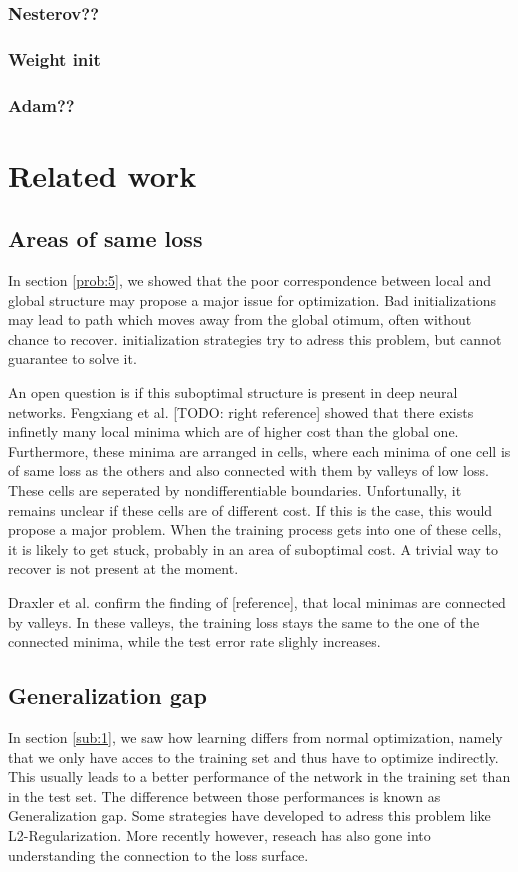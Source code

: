 \subsubsection{Nesterov??}
\subsubsection{Weight init}
\subsubsection{Adam??}


\section{Related work}
\subsection{Areas of same loss}\label{loss_landscape}
In section \ref{prob:5}, we showed that the poor correspondence between local
and global structure may propose a major issue for optimization. Bad
initializations may lead to path which moves away from the global otimum, often
without chance to recover. initialization strategies try to adress this problem,
but cannot guarantee to solve it.

An open question is if this suboptimal structure is present in deep neural
networks. Fengxiang et al. [TODO: right reference] showed that there exists
infinetly many local minima which are of higher cost than the global one.
Furthermore, these minima are arranged in cells, where each minima of one cell
is of same loss as the others and also connected with them by valleys of low
loss. These cells are seperated by nondifferentiable boundaries.
Unfortunally, it remains unclear if these cells are of different cost. If this
is the case, this would propose a major problem. When the training process gets
into one of these cells, it is likely to get stuck, probably in an area of
suboptimal cost. A trivial way to recover is not present at the moment.

Draxler et al. confirm the finding of [reference], that local minimas are
connected by valleys. In these valleys, the training loss stays the same to the
one of the connected minima, while the test error rate slighly increases.

\subsection{Generalization gap}
In section \ref{sub:1}, we saw how learning differs from normal optimization,
namely that we only have acces to the training set and thus have to optimize
indirectly. This usually leads to a better performance of the network in the
training set than in the test set. The difference between those performances is
known as Generalization gap. Some strategies have developed to adress this
problem like L2-Regularization. More recently however, reseach has also gone
into understanding the connection to the loss surface. 


